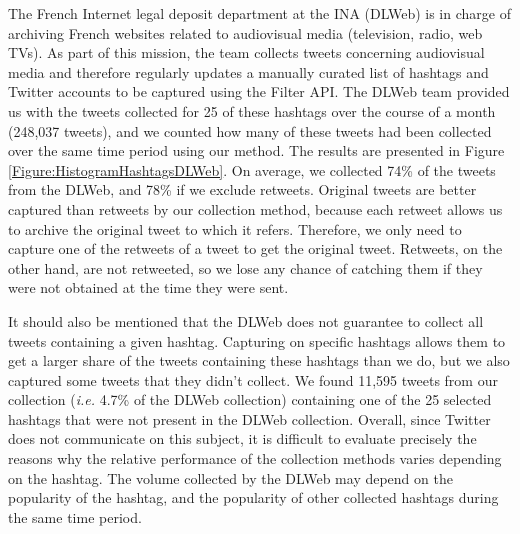 The French Internet legal deposit department at the INA (DLWeb) is in charge of archiving French websites related to audiovisual media (television, radio, web TVs). As part of this mission, the team collects tweets concerning audiovisual media and therefore regularly updates a manually curated list of hashtags and Twitter accounts to be captured using the Filter API. The DLWeb team provided us with the tweets collected for 25 of these hashtags over the course of a month (248,037 tweets), and we counted how many of these tweets had been collected over the same time period using our method. The results are presented in Figure \ref{Figure:HistogramHashtagsDLWeb}. On average, we collected 74\% of the tweets from the DLWeb, and 78\% if we exclude retweets. Original tweets are better captured than retweets by our collection method, because each retweet allows us to archive the original tweet to which it refers. Therefore, we only need to capture one of the retweets of a tweet to get the original tweet. Retweets, on the other hand, are not retweeted, so we lose any chance of catching them if they were not obtained at the time they were sent.



It should also be mentioned that the DLWeb does not guarantee to collect all tweets containing a given hashtag. Capturing on specific hashtags allows them to get a larger share of the tweets containing these hashtags than we do, but we also captured some tweets that they didn't collect. We found 11,595 tweets from our collection (\textit{i.e.}  4.7\% of the DLWeb collection) containing one of the 25 selected hashtags that were not present in the DLWeb collection.
Overall, since Twitter does not communicate on this subject, it is difficult to evaluate precisely the reasons why the relative performance of the collection methods varies depending on the hashtag. The volume collected by the DLWeb may depend on the popularity of the hashtag, and the popularity of other collected hashtags during the same time period.

